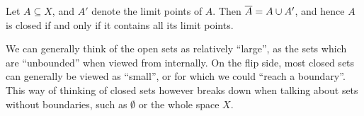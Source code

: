 \documentclass[11pt]{article}
\begin{document}
\begin{proposition}
    Let $A \subseteq X$, and $A'$ denote the limit points of $A$. Then $\overline{A} = A \cup A'$, and hence $A$ is closed if and only if it contains all its limit points.
\end{proposition}

We can generally think of the open sets as relatively ``large'', as the sets which are ``unbounded'' when viewed from internally. On the flip side, most closed sets can generally be viewed as ``small'', or for which we could ``reach a boundary''. This way of thinking of closed sets however breaks down when talking about sets without boundaries, such as $\emptyset$ or the whole space $X$.
\end{document}
